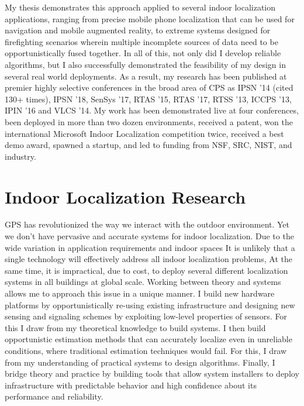 \documentclass[10pt]{article}
\begin{document}
My thesis demonstrates this approach applied to several indoor localization applications, ranging from precise mobile phone localization that can be used for navigation and mobile augmented reality, to extreme systems designed for firefighting scenarios wherein multiple incomplete sources of data need to be opportunistically fused together. 
In all of this, not only did I develop reliable algorithms, but I also successfully demonstrated the feasibility of my design in several real world deployments.
As a result, my research has been published at premier highly selective conferences in the broad area of CPS as IPSN '14 (cited 130+ times), IPSN '18, SenSys '17, RTAS '15, RTAS '17, RTSS '13, ICCPS '13, IPIN '16 and VLCS '14. My work has been demonstrated live at four conferences, been deployed in more than two dozen environments, received a patent, won the international Microsoft Indoor Localization competition twice, received a best demo award, spawned a startup, and led to funding from NSF, SRC, NIST, and industry.



\section{Indoor Localization Research}

GPS has revolutionized the way we interact with the outdoor environment.  %
Yet we don't have pervasive and accurate systems for indoor localization.  
Due to the wide variation in application requirements and indoor spaces It is unlikely that a single technology will effectively address all indoor localization problems,  At the same time, it is impractical, due to cost, to deploy several different localization systems in all buildings at global scale. %
Working between theory and systems allows me to approach this issue in a unique manner. I build new hardware platforms by opportunistically re-using existing infrastructure and designing new sensing and signaling schemes by exploiting low-level properties of sensors. For this I draw from my theoretical knowledge to build systems. I then build opportunistic estimation methods that can accurately localize even in unreliable conditions, where traditional estimation techniques would fail. For this, I draw from my understanding of practical systems to design algorithms. Finally, I bridge theory and practice by building tools that allow system installers to deploy infrastructure with predictable behavior and high confidence about its performance and reliability.  
\end{document}
